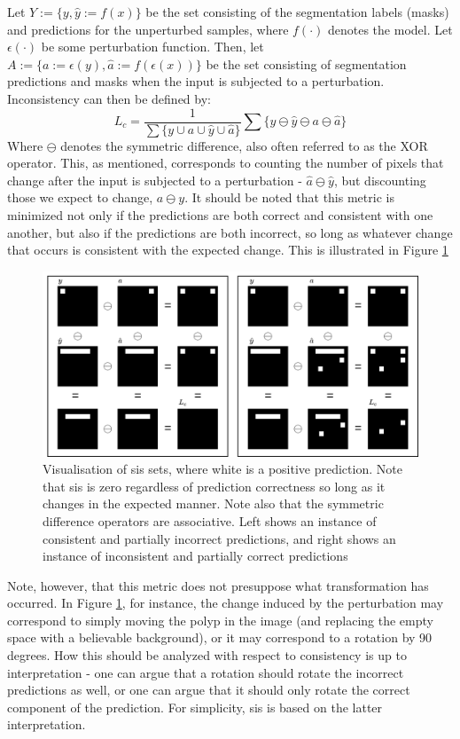 Let \(Y:=\{y,\hat{y}:=f(x)\}\) be the set consisting of the segmentation labels (masks) and predictions for the unperturbed samples, where \(f(\cdot)\) denotes the model. Let \(\epsilon(\cdot)\) be some perturbation function. Then, let \(A:=\{a:=\epsilon(y),\hat{a}:=f(\epsilon(x))\}\) be the set consisting of segmentation predictions and masks when the input is subjected to a perturbation. Inconsistency can then be defined by:
\begin{equation}
    L_c = \frac{1}{\sum\{y \cup a \cup \hat{y} \cup \hat{a} \}} \sum \{y\ominus\hat{y}\ominus a\ominus\hat{a}\}
\end{equation}
Where \(\ominus \) denotes the symmetric difference, also often referred to as the XOR operator.
This, as mentioned, corresponds to counting the number of pixels that change after the input is subjected to a perturbation - \(\hat{a}\ominus \hat{y}\), but discounting those we expect to change, \(a\ominus y\). 
It should be noted that this metric is minimized not only if the predictions are both correct and consistent with one another, but also if the predictions are both incorrect, so long as whatever change that occurs is consistent with the expected change. This is illustrated in Figure \ref{loss_fn}
\begin{figure}[ht]
    \includegraphics[width=\linewidth]{illustrations/loss_visualisation.drawio.png}
    \caption{Visualisation of \gls{sis} sets, where white is a positive prediction. Note that \gls{sis} is zero regardless of prediction correctness so long as it changes in the expected manner. Note also that the symmetric difference operators are associative. Left shows an instance of consistent and partially incorrect predictions, and right shows an instance of inconsistent and partially correct predictions}
    \label{loss_fn}
\end{figure}  
    
Note, however, that this metric does not presuppose what transformation has occurred. In Figure \ref{loss_fn}, for instance, the change induced by the perturbation may correspond to simply moving the polyp in the image (and replacing the empty space with a believable background), or it may correspond to a rotation by 90 degrees. How this should be analyzed with respect to consistency is up to interpretation - one can argue that a rotation should rotate the incorrect predictions as well, or one can argue that it should only rotate the correct component of the prediction. For simplicity, \gls{sis} is based on the latter interpretation. 

